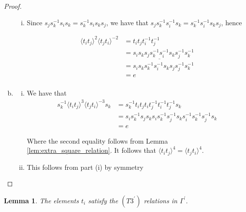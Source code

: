 \documentclass[11pt]{amsart}
\newtheorem{lem}[thm]{Lemma}
\theoremstyle{definition}
\begin{document}
\begin{proof}
\begin{enumerate}[a)]
\begin{enumerate}[i)]
\item Since $s_js_k^{-1}s_is_k = s_k^{-1}s_is_ks_j$, we have that $s_js_k^{-1}s_i^{-1}s_k = s_k^{-1}s_i^{-1}s_ks_j$, hence

\begin{align*}
\langle t_it_j \rangle^{2}\langle t_jt_i \rangle^{-2} &= t_it_jt_i^{-1}t_j^{-1}\\
&= s_is_k\underline{s_js_k^{-1}s_i^{-1}s_k}s_j^{-1}s_k^{-1}\\
&= s_is_ks_k^{-1}s_i^{-1}s_ks_js_j^{-1}s_k^{-1}\\
&= e\\
\end{align*}

\end{enumerate}
\item
\begin{enumerate}[i)]
\item We have that
\begin{align*}
s_k^{-1}\langle t_it_j \rangle^{3}\langle t_jt_i \rangle^{-3}s_k &= s_k^{-1}t_it_jt_it_j^{-1}t_i^{-1}t_j^{-1}s_k\\
&= s_is_k^{-1}s_js_ks_is_k^{-1}s_j^{-1}s_ks_i^{-1}s_k^{-1}s_j^{-1}s_k\\
&= e
\end{align*}

Where the second equality follows from Lemma \ref{lem:extra_square_relation}.  It follows that $\langle t_it_j \rangle^{4} = \langle t_jt_i \rangle^{4}$.

\item This follows from part (i) by symmetry
\end{enumerate}
\end{enumerate}
\end{proof}



\begin{lem}\label{lem:r3_relations}
The elements $t_i$ satisfy the $(T3^\prime)$ relations in $\Gamma^\prime$.
\end{lem}
\end{document}
